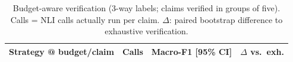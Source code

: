 \begin{table}[t]
\centering\small
\setlength{\tabcolsep}{4pt}
\begin{tabular}{lccc}
\toprule
Strategy @ budget/claim & Calls & Macro-F1 [95\% CI] & $\Delta$ vs.\ exh. \\
\midrule

\bottomrule
\end{tabular}
\caption{Budget-aware verification (3-way labels; claims verified in groups of five). Calls = NLI calls actually run per claim. $\Delta$: paired bootstrap difference to exhaustive verification.}
\label{tab:budget}
\end{table}
